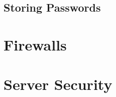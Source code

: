 \documentclass{article}
\begin{document}
\subsection{Storing Passwords}

\section{Firewalls}
\label{sec:firewalls}



\section{Server Security}
\label{sec:serversec}


\end{document}
